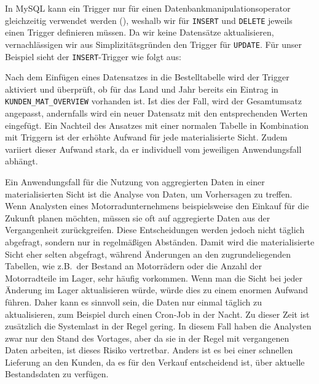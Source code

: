 In MySQL kann ein Trigger nur für einen Datenbankmanipulationsoperator gleichzeitig verwendet werden (\cite{mysql_trigger_syntax}), weshalb wir für \texttt{INSERT} und \texttt{DELETE} jeweils einen Trigger definieren müssen.
Da wir keine Datensätze aktualisieren, vernachlässigen wir aus Simplizitätsgründen den Trigger für \texttt{UPDATE}.
Für unser Beispiel sieht der \texttt{INSERT}-Trigger wie folgt aus:

\vspace{-5pt}


Nach dem Einfügen eines Datensatzes in die Bestelltabelle wird der Trigger aktiviert und überprüft, ob für das Land und Jahr bereits ein Eintrag in \texttt{KUNDEN\_MAT\_OVERVIEW} vorhanden ist.
Ist dies der Fall, wird der Gesamtumsatz angepasst, andernfalls wird ein neuer Datensatz mit den entsprechenden Werten eingefügt.
Ein Nachteil des Ansatzes mit einer normalen Tabelle in Kombination mit Triggern ist der erhöhte Aufwand für jede materialisierte Sicht.
Zudem variiert dieser Aufwand stark, da er individuell vom jeweiligen Anwendungsfall abhängt.

Ein Anwendungsfall für die Nutzung von aggregierten Daten in einer materialisierten Sicht ist die Analyse von Daten, um Vorhersagen zu treffen.
Wenn Analysten eines Motorradunternehmens beispielsweise den Einkauf für die Zukunft planen möchten, müssen sie oft auf aggregierte Daten aus der Vergangenheit zurückgreifen.
Diese Entscheidungen werden jedoch nicht täglich abgefragt, sondern nur in regelmäßigen Abständen.
Damit wird die materialisierte Sicht eher selten abgefragt, während Änderungen an den zugrundeliegenden Tabellen, wie z.B.\ der Bestand an Motorrädern oder die Anzahl der Motorradteile im Lager, sehr häufig vorkommen.
Wenn man die Sicht bei jeder Änderung im Lager aktualisieren würde, würde dies zu einem enormen Aufwand führen.
Daher kann es sinnvoll sein, die Daten nur einmal täglich zu aktualisieren, zum Beispiel durch einen Cron-Job in der Nacht.
Zu dieser Zeit ist zusätzlich die Systemlast in der Regel gering.
In diesem Fall haben die Analysten zwar nur den Stand des Vortages, aber da sie in der Regel mit vergangenen Daten arbeiten, ist dieses Risiko vertretbar.
Anders ist es bei einer schnellen Lieferung an den Kunden, da es für den Verkauf entscheidend ist, über aktuelle Bestandsdaten zu verfügen.

